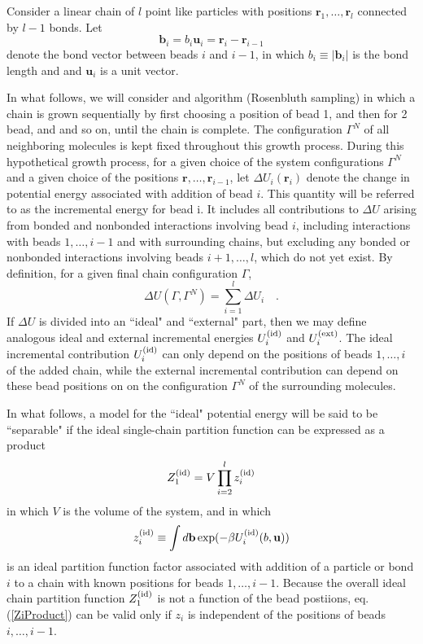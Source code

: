 \documentclass[12pt]{article} %
\newcommand{\vv}[1]{\mathbf{#1}}
\newcommand\system{\Gamma^{N}}
\newcommand\chain{\Gamma}
\newcommand\delU{\Delta U}
\newcommand\Uid{U^{({\rm id})}}
\newcommand\Uext{U^{({\rm ext})}}
\newcommand\Zid{Z^{({\rm id})}}
\newcommand\vbead{\vv{r}}
\newcommand\nbead{l}
\newcommand\vbond{\vv{b}}
\newcommand\ubond{\vv{u}}
\newcommand\rbond{b}
\newcommand\nbond{l-1}
\newcommand\zid{z^{({\rm id})}}
\begin{document}
Consider a linear chain of $\nbead$ point like particles with positions 
$\vbead_{1},\ldots,\vbead_{\nbead}$ connected by $\nbond$ bonds. Let 
\begin{equation}
   \vbond_{i} = \rbond_{i} \ubond_{i} = \vbead_{i} - \vbead_{i-1}
\end{equation}
denote the bond vector between beads $i$ and $i-1$, in which 
$\rbond_{i} \equiv |\vbond_{i}|$ is the bond length and and $\ubond_{i}$ is a unit 
vector.  

In what follows, we will consider and algorithm (Rosenbluth sampling) in which a chain is grown sequentially by first choosing a position of bead 1, and then for 2 bead, and and so on, until the chain is complete.  The configuration $\system$ of all neighboring molecules is kept fixed throughout this growth process. During this hypothetical growth process, for a given choice of the system configurations $\system$ and a given choice of the positions $\vbead, \ldots, \vbead_{i-1}$, let $\delU_{i}(\vbead_{i})$ denote the change in potential energy associated with addition of bead $i$.  This quantity will be referred to as the incremental energy for bead i. It includes all contributions to $\delU$ arising from bonded and nonbonded interactions involving bead $i$, including interactions with beads $1,\ldots, i-1$ and with surrounding chains, but excluding any bonded or nonbonded interactions involving beads $i+1,\ldots,\nbead$, which do not yet exist. By definition, for a given final chain configuration $\chain$,
\begin{equation}
   \delU(\chain, \system) = \sum_{i=1}^{\nbead} \delU_{i} \quad.
\end{equation}
If $\delU$ is divided into an ``ideal" and ``external" part, then we may define analogous ideal and external incremental energies $\Uid_{i}$ and $\Uext_{i}$. The ideal incremental contribution $\Uid_{i}$ can only depend on the positions of beads $1,\ldots,i$ of the added chain, while the external incremental contribution can depend on these bead positions on on the configuration $\system$ of the surrounding molecules.

In what follows, a model for the ``ideal" potential energy will be said to be ``separable" if the ideal single-chain partition function can be expressed as a product
\begin{equation}
    \Zid_{1} = V \prod_{i=2}^{\nbead} \zid_{i}
    \label{ZidProduct}
\end{equation}
in which $V$ is the volume of the system, and in which
\begin{equation}
    \zid_{i} \equiv \int d\vbond 
    \exp( -\beta \Uid_{i}(\rbond, \ubond) )
    \label{zid}
\end{equation}
is an ideal partition function factor associated with addition of a particle or bond $i$ to a chain with known positions for beads $1, \ldots, i-1$. Because the overall ideal chain partition function $\Zid_{1}$ is not a function of the bead postiions, eq. (\ref{ZiProduct}) can be valid only if $z_{i}$ is independent of the positions of beads $i, \ldots, i-1$.
\end{document}
